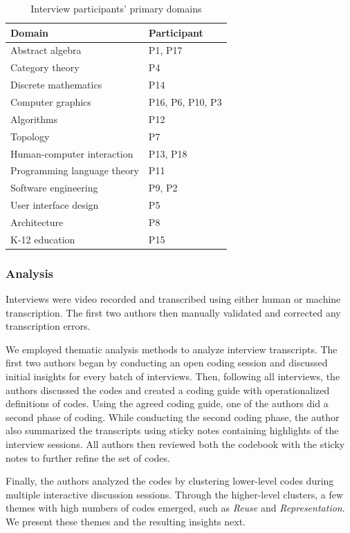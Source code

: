 \begin{center}
\begin{table}
\centering
\begin{tabular}{l|l}
Domain & Participant \\ \hline
Abstract algebra & P1, P17 \\ 
Category theory & P4\\ 
Discrete mathematics & P14 \\ 
Computer graphics & P16, P6, P10, P3 \\ 
Algorithms & P12 \\ 
Topology & P7 \\ 
Human-computer interaction & P13, P18 \\ 
Programming language theory & P11 \\ 
Software engineering & P9, P2\\ 
User interface design & P5\\ 
Architecture & P8 \\ 
K-12 education & P15 \\ 
\end{tabular}
\caption{Interview participants' primary domains}
\label{tbl:participants}
\end{table}
\end{center}

\subsubsection{Analysis}
Interviews were video recorded and transcribed using either human or machine transcription. The first two authors then manually validated and corrected any transcription errors.

We employed thematic analysis methods \cite{thematicAnalysisInPsych} to analyze interview transcripts. The first two authors began by conducting an open coding session and discussed initial insights for every batch of interviews. Then, following all interviews, the authors discussed the codes and created a coding guide with operationalized definitions of codes. Using the agreed coding guide, one of the authors did a second phase of coding. While conducting the second coding phase, the author also summarized the transcripts using sticky notes containing highlights of the interview sessions. All authors then reviewed both the codebook with the sticky notes to further refine the set of codes.

Finally, the authors analyzed the codes by clustering lower-level codes during multiple interactive discussion sessions. Through the higher-level clusters, a few themes with high numbers of codes emerged, such as \emph{Reuse} and \emph{Representation}. We present these themes and the resulting insights next.

